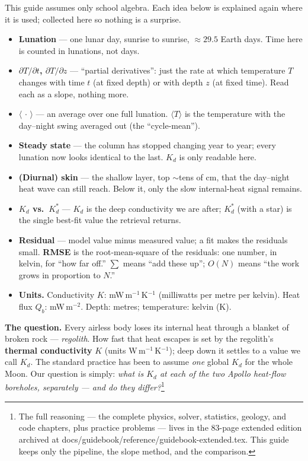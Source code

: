 \documentclass[11pt]{report}
\newcommand{\code}[1]{{\ttfamily\small #1}}
\begin{document}
\begin{plain}[title={\sffamily\bfseries Reading this guide --- the few basics you'll need}]
This guide assumes only school algebra. Each idea below is explained again where it is
used; collected here so nothing is a surprise.
\begin{itemize}[leftmargin=1.2em,itemsep=1pt,topsep=2pt]
\item \textbf{Lunation} --- one lunar day, sunrise to sunrise, $\approx29.5$ Earth days.
  Time here is counted in lunations, not days.
\item \textbf{$\partial T/\partial t$, $\partial T/\partial z$} --- ``partial derivatives'':
  just the rate at which temperature $T$ changes with time $t$ (at fixed depth) or with
  depth $z$ (at fixed time). Read each as a slope, nothing more.
\item \textbf{$\langle\,\cdot\,\rangle$} --- an average over one full lunation. $\langle
  T\rangle$ is the temperature with the day--night swing averaged out (the ``cycle-mean'').
\item \textbf{Steady state} --- the column has stopped changing year to year; every
  lunation now looks identical to the last. $K_d$ is only readable here.
\item \textbf{(Diurnal) skin} --- the shallow layer, top $\sim$tens of cm, that the
  day--night heat wave can still reach. Below it, only the slow internal-heat signal remains.
\item \textbf{$K_d$ vs.\ $K_d^{*}$} --- $K_d$ is the deep conductivity we are after;
  $K_d^{*}$ (with a star) is the single best-fit value the retrieval returns.
\item \textbf{Residual} --- model value minus measured value; a fit makes the residuals small.
  \textbf{RMSE} is the root-mean-square of the residuals: one number, in kelvin, for ``how
  far off.'' \textbf{$\textstyle\sum$} means ``add these up''; \textbf{$O(N)$} means ``the
  work grows in proportion to $N$.''
\item \textbf{Units.} Conductivity $K$: mW\,m$^{-1}$\,K$^{-1}$ (milliwatts per metre per
  kelvin). Heat flux $Q_b$: mW\,m$^{-2}$. Depth: metres; temperature: kelvin (K).
\end{itemize}
\end{plain}

\noindent\textbf{The question.} Every airless body loses its internal heat
through a blanket of broken rock --- \emph{regolith}. How fast that heat escapes
is set by the regolith's \textbf{thermal conductivity} $K$ (units
W\,m$^{-1}$\,K$^{-1}$); deep down it settles to a value we call $K_d$. The
standard practice has been to assume \emph{one} global $K_d$ for the whole Moon.
Our question is simply: \emph{what is $K_d$ at each of the two Apollo heat-flow
boreholes, separately --- and do they differ?}\footnote{The full reasoning ---
the complete physics, solver, statistics, geology, and code chapters, plus
practice problems --- lives in the 83-page extended edition archived at
\code{docs/guidebook/reference/guidebook-extended.tex}. This guide keeps only
the pipeline, the slope method, and the comparison.}
\end{document}
